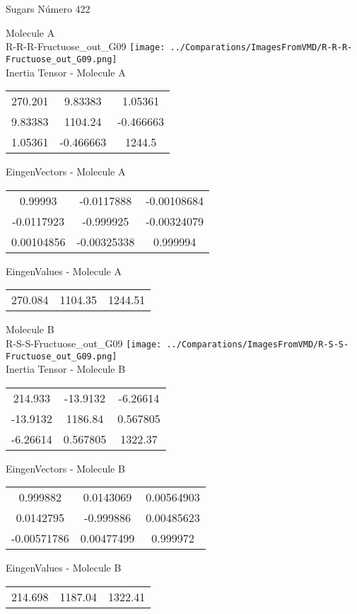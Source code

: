 \vtab[-2cm]
\begin{center}
{\large Sugars \tab Número 422}
\end{center}
\begin{multicols}{2}
\begin{center}

Molecule A \\ 
R-R-R-Fructuose\_out\_G09
\texttt{[image: ../Comparations/ImagesFromVMD/R-R-R-Fructuose\_out\_G09.png]}
\\
Inertia Tensor - Molecule A \\
\vtab

\begin{tabular}{|c c c|}
270.201	 & 	9.83383	 & 	1.05361	 \\
9.83383	 & 	1104.24	 & 	-0.466663	 \\
1.05361	 & 	-0.466663	 & 	1244.5
\end{tabular}

\vtab
 EingenVectors - Molecule A     \\
\vtab
\begin{tabular}{|c c c|}
0.99993	 & 	-0.0117888	 & 	-0.00108684	 \\
-0.0117923	 & 	-0.999925	 & 	-0.00324079	 \\
0.00104856	 & 	-0.00325338	 & 	0.999994
\end{tabular}

\vtab
 EingenValues - Molecule A     \\
\vtab
\begin{tabular}{|c c c|}
270.084	 & 	1104.35	 & 	1244.51	 \\
\end{tabular}
\columnbreak

Molecule B \\ 
R-S-S-Fructuose\_out\_G09
\texttt{[image: ../Comparations/ImagesFromVMD/R-S-S-Fructuose\_out\_G09.png]}
\\
Inertia Tensor - Molecule B \\
\vtab

\begin{tabular}{|c c c|}
214.933	 & 	-13.9132	 & 	-6.26614	 \\
-13.9132	 & 	1186.84	 & 	0.567805	 \\
-6.26614	 & 	0.567805	 & 	1322.37
\end{tabular}

\vtab
 EingenVectors - Molecule B     \\
\vtab
\begin{tabular}{|c c c|}
0.999882	 & 	0.0143069	 & 	0.00564903	 \\
0.0142795	 & 	-0.999886	 & 	0.00485623	 \\
-0.00571786	 & 	0.00477499	 & 	0.999972
\end{tabular}

\vtab
 EingenValues - Molecule B     \\
\vtab
\begin{tabular}{|c c c|}
214.698	 & 	1187.04	 & 	1322.41	 \\
\end{tabular}

\end{center}
\end{multicols}

